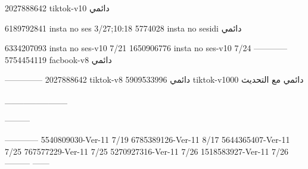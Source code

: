 2027888642 tiktok-v10
دائمي

6189792841 insta no ses
3/27;10:18
5774028 insta no sesidi
دائمي

6334207093 insta no ses-v10
7/21
1650906776 insta no ses-v10
7/24
------------
5754454119 facbook-v8
دائمي


--------------
2027888642 tiktok-v8
دائمي
5909533996 tiktok-v1000
دائمي مع التحديث

__________

---------

------------
5540809030-Ver-11
7/19
6785389126-Ver-11
8/17
5644365407-Ver-11
7/25
767577229-Ver-11
7/25
5270927316-Ver-11
7/26
1518583927-Ver-11
7/26
---------
------
